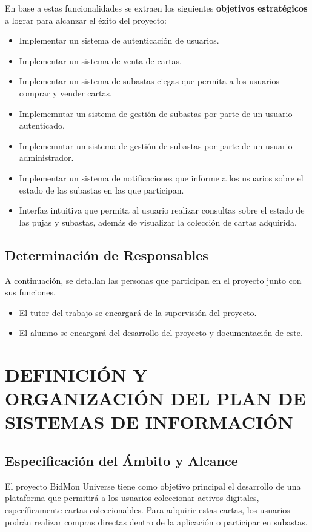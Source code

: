 En base a estas funcionalidades se extraen los siguientes \textbf{objetivos estratégicos} a lograr para alcanzar el éxito del proyecto:

\begin{itemize}
    \item Implementar un sistema de autenticación de usuarios.
    \item Implementar un sistema de venta de cartas.
    \item Implementar un sistema de subastas ciegas que permita a los usuarios comprar y vender cartas.
    \item Implememntar un sistema de gestión de subastas por parte de un usuario autenticado.
    \item Implememntar un sistema de gestión de subastas por parte de un usuario administrador.
    \item Implementar un sistema de notificaciones que informe a los usuarios sobre el estado de las subastas en las que participan.
    \item Interfaz intuitiva que permita al usuario realizar consultas sobre el estado de las pujas y subastas, además de visualizar la colección de cartas adquirida.
\end{itemize}

\subsection{Determinación de Responsables}
A continuación, se detallan las personas que participan en el proyecto junto con sus funciones.
\begin{itemize}
    \item El tutor del trabajo se encargará de la supervisión del proyecto.
    \item El alumno se encargará del desarrollo del proyecto y documentación de este. 
\end{itemize}

\newpage
\section{DEFINICIÓN Y ORGANIZACIÓN DEL PLAN DE SISTEMAS DE INFORMACIÓN}
 

\subsection{Especificación del Ámbito y Alcance} 
El proyecto BidMon Universe tiene como objetivo principal el desarrollo de una plataforma que permitirá a los usuarios coleccionar activos digitales, específicamente cartas coleccionables. 
Para adquirir estas cartas, los usuarios podrán realizar compras directas dentro de la aplicación o participar en subastas.

